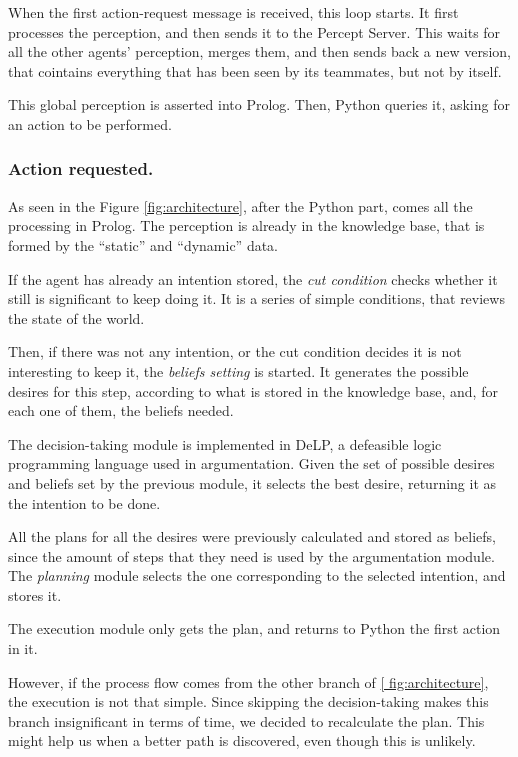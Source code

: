 \documentclass{llncs2e/llncs}
\begin{document}
    When the first action-request message is received, this loop starts. It 
    first processes the perception, and then sends it to the Percept Server. 
    This waits for all the other agents' perception, merges them, and then sends 
    back a new version, that cointains everything that has been seen by its
    teammates, but not by itself.
    
    This global perception is asserted into Prolog. Then, Python queries it,
    asking for an action to be performed.
    
\subsubsection{Action requested.}

    As seen in the Figure \ref{fig:architecture}, after the Python part, comes 
    all the processing in Prolog. The perception is already in the knowledge 
    base, that is formed by the ``static'' and ``dynamic'' data. 

    If the agent has already an intention stored, the \textit{cut condition} 
    checks whether it still is significant to keep doing it. It is a series of 
    simple conditions, that reviews the state of the world.

    Then, if there was not any intention, or the cut condition decides it is not 
    interesting to keep it, the \textit{beliefs setting} is started. It 
    generates the possible desires for this step, according to what is stored in 
    the knowledge base, and, for each one of them, the beliefs needed.

    The decision-taking module is implemented in DeLP, a defeasible logic 
    programming language used in argumentation. Given the set of possible 
    desires and beliefs set by the previous module, it selects the best desire, 
    returning it as the intention to be done.

    All the plans for all the desires were previously calculated and stored as 
    beliefs, since the amount of steps that they need is used by the 
    argumentation module. The \textit{planning} module selects the one 
    corresponding to the selected intention, and stores it.

    The execution module only gets the plan, and returns to Python the first 
    action in it.

    However, if the process flow comes from the other branch of \ref{
    fig:architecture}, the execution is not that simple. Since skipping the 
    decision-taking makes this branch insignificant in terms of time, we decided 
    to recalculate the plan. This might help us when a better path is 
    discovered, even though this is unlikely.
\end{document}

